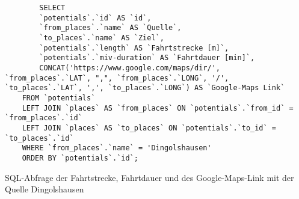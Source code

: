 \begin{listing}[htbp]
    \begin{verbatim}
        SELECT 
        `potentials`.`id` AS `id`, 
        `from_places`.`name` AS `Quelle`,
        `to_places`.`name` AS `Ziel`, 
        `potentials`.`length` AS `Fahrtstrecke [m]`, 
        `potentials`.`miv-duration` AS `Fahrtdauer [min]`,
        CONCAT('https://www.google.com/maps/dir/', `from_places`.`LAT`, ",", `from_places`.`LONG`, '/', `to_places`.`LAT`, ',', `to_places`.`LONG`) AS `Google-Maps Link`
    FROM `potentials`
    LEFT JOIN `places` AS `from_places` ON `potentials`.`from_id` = `from_places`.`id`
    LEFT JOIN `places` AS `to_places` ON `potentials`.`to_id` = `to_places`.`id`
    WHERE `from_places`.`name` = 'Dingolshausen'
    ORDER BY `potentials`.`id`;
    \end{verbatim}
    \caption{SQL-Abfrage der Fahrtstrecke, Fahrtdauer und des Google-Maps-Link mit der Quelle Dingolshausen}\label{lst-f-dingolshausen}
\end{listing}
